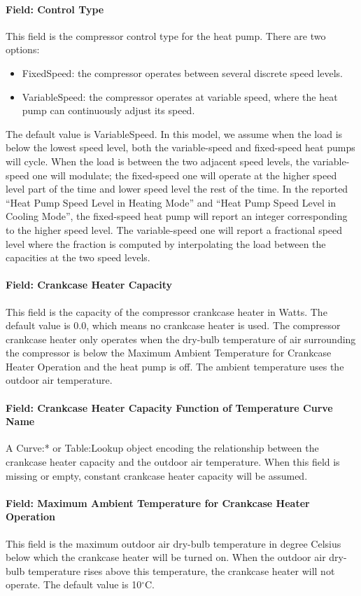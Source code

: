 \paragraph{Field: Control Type} This field is the compressor control type for
the heat pump. There are two options:

\begin{itemize}
\item FixedSpeed: the compressor operates between several discrete speed levels.
\item VariableSpeed: the compressor operates at variable speed, where the heat
  pump can continuously adjust its speed.
\end{itemize}
The default value is VariableSpeed. In this model, we assume when the load is
below the lowest speed level, both the variable-speed and fixed-speed heat pumps
will cycle. When the load is between the two adjacent speed levels, the
variable-speed one will modulate; the fixed-speed one will operate at the higher
speed level part of the time and lower speed level the rest of the time. In the
reported ``Heat Pump Speed Level in Heating Mode'' and ``Heat Pump Speed Level
in Cooling Mode'', the fixed-speed heat pump will report an integer corresponding to
the higher speed level. The variable-speed one will report a fractional speed
level where the fraction is computed by interpolating the load between the capacities
at the two speed levels.
\paragraph{Field: Crankcase Heater Capacity} This field is the capacity of the
compressor crankcase heater in Watts. The default value is 0.0, which means no
crankcase heater is used. The compressor crankcase heater only operates when the
dry-bulb temperature of air surrounding the compressor is below the Maximum
Ambient Temperature for Crankcase Heater Operation and the heat pump is off. The
ambient temperature uses the outdoor air temperature.
\paragraph{Field: Crankcase Heater Capacity Function of Temperature Curve Name}
A Curve:* or Table:Lookup object encoding the relationship between the crankcase
heater capacity and the outdoor air temperature. When this field is missing or
empty, constant crankcase heater capacity will be assumed.
\paragraph{Field: Maximum Ambient Temperature for Crankcase Heater Operation}
This field is the maximum outdoor air dry-bulb temperature in degree Celsius
below which the crankcase heater will be turned on. When the outdoor air dry-bulb
temperature rises above this temperature, the crankcase heater will not operate.
The default value is 10$^\circ$C.
